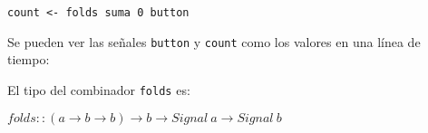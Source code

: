\begin{center}
\begin{Verbatim}[frame=single]
count <- folds suma 0 button
\end{Verbatim}
\end{center}

Se pueden ver las señales \texttt{button} y \texttt{count} como los
valores en una línea de tiempo:



El tipo del combinador \texttt{folds} es:

\begin{center}
$folds :: (a \rightarrow b \rightarrow b) \rightarrow b \rightarrow Signal\ a \rightarrow Signal\ b$
\end{center}


